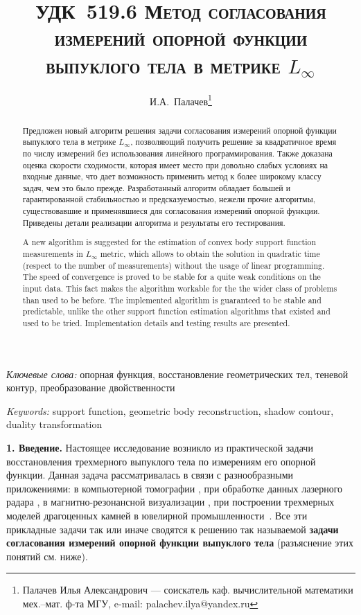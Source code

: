 \documentclass[a4paper, 11pt]{article}
\title{\hbox{\normalsize УДК 519.6}
\textsc{Метод согласования измерений опорной функции выпуклого тела в метрике
$L_{\infty}$}}
\author{И.А.~Палачев\thanks{Палачев Илья Александрович --- соискатель каф.
вычислительной математики мех.--мат. ф-та МГУ, e-mail: palachev.ilya@yandex.ru}}
\date{\vspace{-4\baselineskip}}
\theoremstyle{MyDefinitionStyle}
\theoremstyle{MyTheoremStyle}
\begin{document}
\renewcommand{\abstractname}{\vspace{-\baselineskip}}

\maketitle

\begin{abstract}
Предложен новый алгоритм решения задачи согласования измерений опорной функции
выпуклого тела в метрике $L_{\infty}$, позволяющий получить решение за
квадратичное время по числу измерений без использования линейного
программирования.
Также доказана оценка скорости сходимости, которая имеет место при довольно
слабых условиях на входные данные, что дает возможность применить метод к более
широкому классу задач, чем это было прежде.
Разработанный алгоритм обладает большей  и гарантированной
стабильностью и предсказуемостью, нежели прочие алгоритмы, существовавшие и
применявшиеся для согласования измерений опорной функции.
Приведены детали реализации алгоритма и результаты его тестирования.
\end{abstract}

\emph{Ключевые слова:} опорная функция, восстановление геометрических тел,
теневой контур, преобразование двойственности

\begin{abstract}
A new algorithm is suggested for the estimation of convex body support function
measurements in $L_{\infty}$ metric, which allows to obtain the solution in
quadratic time (respect to the number of measurements) without the usage of
linear programming.
The speed of convergence is proved to be stable for a quite weak conditions on
the input data. This fact makes the algorithm workable for the the wider class
of problems than used to be before.
The implemented algorithm is guaranteed to be stable and predictable, unlike
the other support function estimation algorithms that existed and used to be
tried.
Implementation details and testing results are presented.
\end{abstract}

\emph{Keywords:} support function, geometric body reconstruction,
shadow contour, duality transformation

\textbf{1. Введение.}
Настоящее исследование возникло из практической задачи восстановления трехмерного
выпуклого тела по измерениям его опорной функции. Данная задача рассматривалась
в связи с разнообразными приложениями: в компьютерной томографии
\cite{PrinceWillsky}, при обработке данных лазерного радара
\cite{LeleKulkarniWillsky}, в магнитно-резонансной визуализации
\cite{GregorRannou2001, GregorRannou2002}, при построении трехмерных моделей
драгоценных камней в ювелирной промышленности~\cite{palachev}. Все эти
прикладные задачи так или иначе сводятся к решению так называемой
\textbf{задачи согласования измерений опорной функции выпуклого тела}
(разъяснение этих понятий см. ниже).
\end{document}
